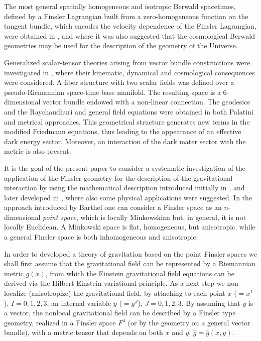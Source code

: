\documentclass[aps,superscriptaddress, showpacs,preprintnumbers, superscriptaddress, nofootinbibt,twocolumn]{revtex4-2}
\begin{document}
The most general spatially
homogeneous and isotropic Berwald spacetimes, defined by a Finsler Lagrangian built from a
zero-homogeneous function on the tangent bundle, which encodes the velocity dependence of the Finsler
Lagrangian, were obtained in \cite{Fc22}, and where it was also suggested that the cosmological Berwald geometries may be used for the
description of the geometry of the Universe.

Generalized scalar-tensor theories arising from vector
bundle constructions were investigated in \cite{Fc24a}, where their kinematic, dynamical and cosmological consequences were considered.  A fiber structure with two scalar fields was defined over a pseudo-Riemannian space-time base manifold. The resulting space is a 6-dimensional vector bundle endowed with a non-linear connection. The geodesics and the Raychaudhuri and general field equations were obtained in both
Palatini and metrical approaches. This geometrical structure generates new terms in the modified Friedmann equations, thus leading to the appearance of an
effective dark energy sector. Moreover, an interaction of the dark mater sector with the metric is also present.

It is the goal of the present paper to consider a systematic investigation of the application of the Finsler geometry for the description of the gravitational interaction by using the mathematical description introduced initially in \cite{Bar1,Bar2}, and later developed in \cite{Ing0,Ing1,Ing2,Ing2a}, where also some physical applications were suggested.  In the approach introduced by Barthel one can consider
a Finsler space as an $n$-dimensional {\it point space}, which is locally Minkowskian but, in general, it is not locally Euclidean. A Minkowski space is flat, homogeneous, but anisotropic, while a general Finsler space is both inhomogeneous and anisotropic.

In order to developed a theory of gravitation based on the point Finsler spaces we shall first assume that the gravitational field can be represented by a Riemannian metric $g(x)$, from which the Einstein gravitational field equations can be derived via the Hilbert-Einstein variational principle. As a next step we non-localize (anisotropize) the gravitational field, by attaching to each point $x$ ($=x^{I }$), $I =0,1,2,3$, an internal variable $y$ ($=y^{J}$), $J =0,1,2,3$. By assuming that $y$ is a vector, the nonlocal gravitational field can be described by a Finsler type geometry,
realized in a Finsler space $F^{4}$ (or by the geometry on a general vector bundle), with a metric tensor that depends on both $x$ and $y$, $\hat{g}=%
\hat{g}(x,y)$.
\end{document}
